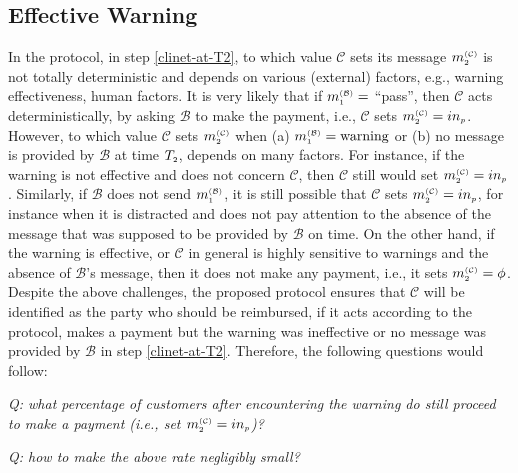  \subsection{Effective Warning}
In the protocol, in step \ref{clinet-at-T2}, to which value  $\mathcal{C}$ sets its message $m_{\scriptscriptstyle 2}^{\scriptscriptstyle(\mathcal C)}$ is not totally deterministic  and depends on various (external) factors, e.g., warning effectiveness,  human factors. It is very  likely that  if $m_{\scriptscriptstyle 1}^{\scriptscriptstyle(\mathcal B)}=$ ``pass'', then $\mathcal{C}$ acts deterministically, by asking $\mathcal{B}$ to make the payment, i.e.,  $\mathcal{C}$ sets  $m_{\scriptscriptstyle 2}^{\scriptscriptstyle(\mathcal C)}=in_{\scriptscriptstyle p}$.   However,  to which value $\mathcal{C}$ sets $m_{\scriptscriptstyle 2}^{\scriptscriptstyle(\mathcal C)}$ when (a) $m_{\scriptscriptstyle 1}^{\scriptscriptstyle(\mathcal B)}= \text{warning}$ or (b) no message is provided by $\mathcal{B}$ at time $T_{\scriptscriptstyle 2}$, depends on many factors. For instance, if the warning is not effective and does not concern $\mathcal{C}$, then $\mathcal{C}$ still would  set    $m_{\scriptscriptstyle 2}^{\scriptscriptstyle(\mathcal C)}=in_{\scriptscriptstyle p}$. Similarly, if  $\mathcal B$ does not send $m_{\scriptscriptstyle 1}^{\scriptscriptstyle(\mathcal B)}$, it is still possible that $\mathcal{C}$ sets $m_{\scriptscriptstyle 2}^{\scriptscriptstyle(\mathcal C)}=in_{\scriptscriptstyle p}$, for instance when it is distracted and does not pay attention to the absence of  the message that was supposed to be provided by $\mathcal{B}$ on time. On the other hand, if the warning is effective, or $\mathcal{C}$ in general is highly sensitive to warnings and  the absence of $\mathcal B$'s message, then it  does not make any payment, i.e.,  it sets $m_{\scriptscriptstyle 2}^{\scriptscriptstyle(\mathcal C)}=\phi$. Despite the above challenges, the proposed protocol ensures that $\mathcal{C}$ will be identified as the party who should be reimbursed,  if it acts according to the protocol, makes a payment but the warning was ineffective or no message was provided by $\mathcal{B}$ in step \ref{clinet-at-T2}. Therefore, the following questions would  follow: 


  \begin{center}\textit{Q: what percentage of customers after encountering the warning do still proceed to make a payment (i.e., set $m_{\scriptscriptstyle 2}^{\scriptscriptstyle(\mathcal C)}=in_{\scriptscriptstyle p}$)?}
\end{center}


  \begin{center}\textit{Q: how to make the above rate negligibly small?}
  \end{center}



